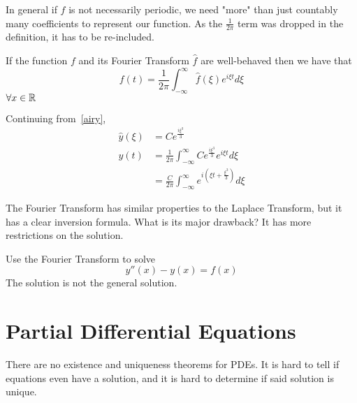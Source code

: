 \documentclass[12pt]{article}
\begin{document}
In general if $f$ is not necessarily periodic, we need "more" than just countably many coefficients to represent our function. As the $\frac{1}{2\pi}$ term was dropped in the definition, it has to be re-included.

\begin{thm}
	If the function $f$ and its Fourier Transform $\hat{f}$ are well-behaved then we have that
	$$f(t) = \frac{1}{2\pi}\int_{-\infty}^\infty\hat{f}(\xi)e^{i\xi t}d\xi$$
	$\forall x \in \mathbb{R}$
\end{thm}

\begin{ex}
	Continuing from~\ref{airy}, 
	\begin{align*}
		\hat{y}(\xi) &= Ce^{\frac{i\xi^3}{3}} \\
		y(t) &= \frac{1}{2\pi}\int_{-\infty}^\infty Ce^{\frac{i\xi^3}{3}}e^{i\xi t}d\xi \\
		     &= \frac{C}{2\pi}\int_{-\infty}^\infty e^{i\left(\xi t + \frac{\xi^3}{3}\right)}d\xi
	\end{align*}
\end{ex}

The Fourier Transform has similar properties to the Laplace Transform, but it has a clear inversion formula. What is its major drawback? It has more restrictions on the solution.

\begin{ex}
	Use the Fourier Transform to solve
	$$y''(x)-y(x) = f(x)$$
	The solution is not the general solution.
\end{ex}

\section{Partial Differential Equations}

There are no existence and uniqueness theorems for PDEs. It is hard to tell if equations even have a solution, and it is hard to determine if said solution is unique.
\end{document}
